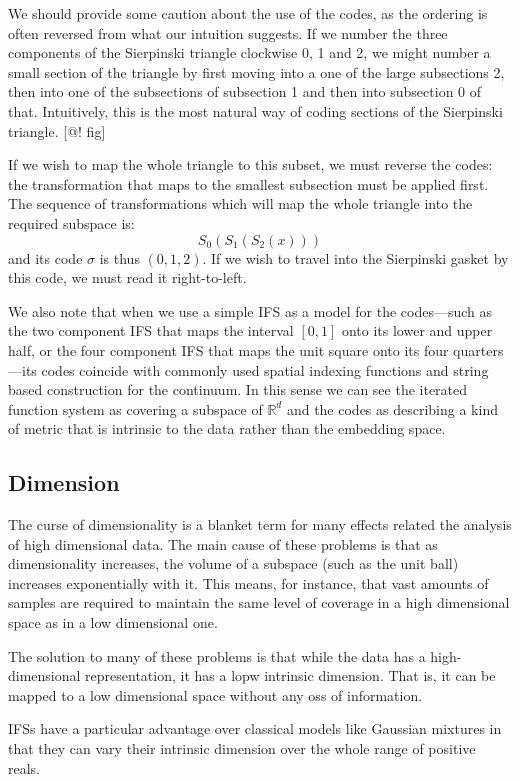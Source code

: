 \documentclass[11pt, twocolumn]{article}
\theoremstyle{definition}
\begin{document}
We should provide some caution about the use of the codes, as the ordering is often reversed from what our intuition suggests. If we number the three components of the Sierpinski triangle clockwise 0, 1 and 2, we might number a small section of the triangle by first moving into a one of the large subsections 2, then into one of the subsections of subsection 1 and then into subsection 0 of that. Intuitively, this is the most natural way of coding sections of the Sierpinski triangle. [@! fig]

If we wish to map the whole triangle to this subset, we must reverse the codes: the transformation that maps to the smallest subsection must be applied first. The sequence of transformations which will map the whole triangle into the required subspace is:
\[
S_0(S_1(S_2(x)))
\]
and its code $\sigma$ is thus $(0, 1, 2)$. If we wish to travel into the Sierpinski gasket by this code, we must read it right-to-left.

We also note that when we use a simple IFS as a model for the codes---such as the two component IFS that maps the interval $[0,1]$ onto its lower and upper half, or the four component IFS that maps the unit square onto its four quarters---its codes coincide with commonly used spatial indexing functions and string based construction for the continuum. In this sense we can see the iterated function system as covering a subspace of ${\mathbb R}^d$ and the codes as describing a kind of metric that is intrinsic to the data rather than the embedding space.

\subsection{Dimension}

The curse of dimensionality is a blanket term for many effects related the analysis of high dimensional data. The main cause of these problems is that as dimensionality increases, the volume of a subspace (such as the unit ball) increases exponentially with it. This means, for instance, that vast amounts of samples are required to maintain the same level of coverage in a high dimensional space as in a low dimensional one. 

The solution to many of these problems is that while the data has a high-dimensional representation, it has a lopw intrinsic dimension. That is, it can be mapped to a low dimensional space without any oss of information.

IFSs have a particular advantage over classical models like Gaussian mixtures in that they can vary their intrinsic dimension over the whole range of positive reals.
\end{document}
